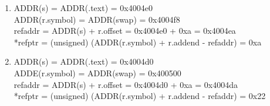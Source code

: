 \documentclass{article}
\begin{document}
\begin{enumerate}[label=\textbf{\Alph*.}]
	\item
	ADDR(s) = ADDR(.text) = 0x4004e0 \\
	ADDR(r.symbol) = ADDR(swap) = 0x4004f8 \\
	refaddr = ADDR(s) + r.offset = 0x4004e0 + 0xa = 0x4004ea \\
	*refptr = (unsigned) (ADDR(r.symbol) + r.addend - refaddr)  = 0xa \\
	\item
	ADDR(s) = ADDR(.text) = 0x4004d0 \\
	ADDE(r.symbol) = ADDR(swap) = 0x400500 \\
	refaddr = ADDR(s) + r.offset = 0x4004d0 + 0xa = 0x4004da \\
	*refptr = (unsigned) (ADDR(r.symbol) + r.addend - refaddr) = 0x22 \\
\end{enumerate}
\end{document}
